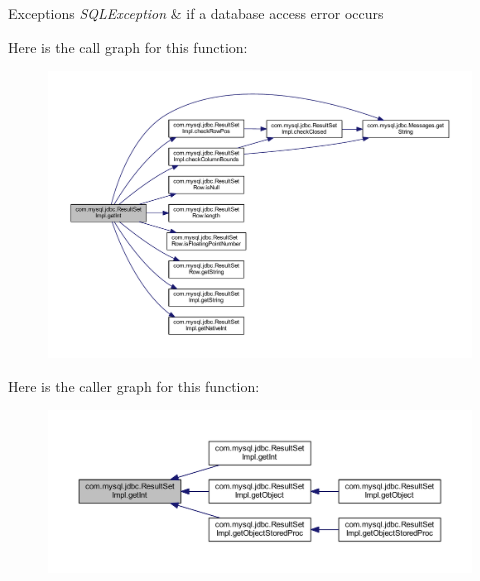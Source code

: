 \begin{DoxyExceptions}{Exceptions}
{\em S\+Q\+L\+Exception} & if a database access error occurs \\
\hline
\end{DoxyExceptions}
Here is the call graph for this function\+:
\nopagebreak
\begin{figure}[H]
\begin{center}
\leavevmode
\includegraphics[width=350pt]{classcom_1_1mysql_1_1jdbc_1_1_result_set_impl_a15131d50936eef4bd078f5471ee12c39_cgraph}
\end{center}
\end{figure}
Here is the caller graph for this function\+:
\nopagebreak
\begin{figure}[H]
\begin{center}
\leavevmode
\includegraphics[width=350pt]{classcom_1_1mysql_1_1jdbc_1_1_result_set_impl_a15131d50936eef4bd078f5471ee12c39_icgraph}
\end{center}
\end{figure}
\mbox{\label{classcom_1_1mysql_1_1jdbc_1_1_result_set_impl_a3c2086aa55638f2572fc804f6a5cc3b9}} 
